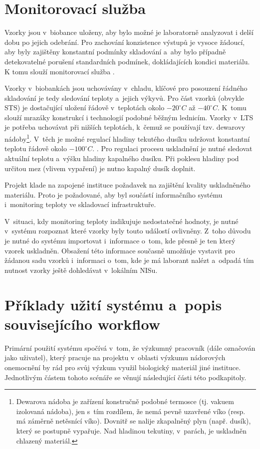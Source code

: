 \section{Monitorovací služba}
Vzorky jsou v~biobance uloženy, aby bylo možné je laboratorně analyzovat i delší dobu po jejich odebrání. Pro zachování konzistence výstupů je vysoce žádoucí, aby byly zajištěny konstantní podmínky skladování a~aby bylo případně detekovatelné porušení standardních podmínek, dokládajících kondici materiálu. K tomu slouží monitorovací služba \ProjectName.

Vzorky v~biobankách jsou uchovávány v~chladu, klíčové pro posouzení řádného skladování je tedy sledování teploty a~jejich výkyvů. Pro část vzorků (obvykle STS) je dostačující uložení řádově v~teplotách okolo $-20^{\circ}C$ až $-40^{\circ}C$. K~tomu slouží mrazáky konstrukcí i technologií podobné běžným lednicím.
Vzorky v~LTS je potřeba uchovávat při nižších teplotách, k~čemuž se používají tzv. dewarovy nádoby\footnote{Dewarova nádoba je zařízení konstručně podobné termosce (tj. vakuem izolovaná nádoba), jen s~tím rozdílem, že nemá pevně uzavřené víko (resp. má záměrně netěsnící víko). Dovnitř se nalije zkapalněný plyn (např. dusík), který se postupně vypařuje. Nad hladinou tekutiny, v~parách, je uskladněn chlazený materiál.}. V~těch je možné regulací hladiny tekutého dusíku udržovat konstantní teplotu řádově okolo $-100^{\circ}C$.
. Pro regulaci procesu uskladnění je nutné sledovat aktuální teplotu a~výšku hladiny kapalného dusíku. Při poklesu hladiny pod určitou mez (vlivem vypaření) je nutno kapalný dusík doplnit. 

Projekt \ProjectName klade na zapojené instituce požadavek na zajištění kvality uskladněného materiálu. Proto je požadované, aby byl součástí informačního systému i~monitoring teploty ve skladovací infrastruktuře.

V~situaci, kdy monitoring teploty indikujuje nedostatečné hodnoty, je nutné v~systému rozpoznat které vzorky byly touto událostí ovlivněny. Z~toho důvodu je nutné do systému importovat i~informace o~tom, kde přesně je ten který vzorek uskladněn. Obsažení této informace současně umožňuje vystavit pro žádanou sadu vzorků i~informaci o~tom, kde je má laborant nalézt a~odpadá tím nutnost vzorky ještě dohledávat v~lokálním NISu.


\section{Příklady užití systému a~popis souvisejícího workflow}
Primární použití systému spočívá v~tom, že výzkumný pracovník (dále označován jako uživatel), který pracuje na projektu v~oblasti výzkumu nádorových onemocnění by rád pro svůj výzkum využil biologický materiál jiné instituce. Jednotlivým částem tohoto scénáře se věnují následující části této podkapitoly.

